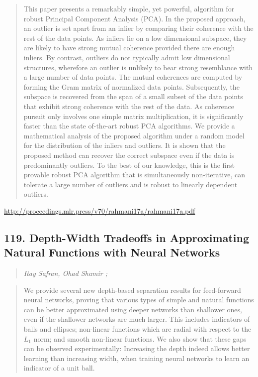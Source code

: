 \documentclass{article}
\begin{document}
\begin{quote}
    This paper presents a remarkably simple, yet powerful, algorithm for robust Principal Component Analysis (PCA). In the proposed approach, an outlier is set apart from an inlier by comparing their coherence with the rest of the data points. As inliers lie on a low dimensional subspace, they are likely to have strong mutual coherence provided there are enough inliers. By contrast, outliers do not typically admit low dimensional structures, wherefore an outlier is unlikely to bear strong resemblance with a large number of data points. The mutual coherences are computed by forming the Gram matrix of normalized data points. Subsequently, the subspace is recovered from the span of a small subset of the data points that exhibit strong coherence with the rest of the data. As coherence pursuit only involves one simple matrix multiplication, it is significantly faster than the state of-the-art robust PCA algorithms. We provide a mathematical analysis of the proposed algorithm under a random model for the distribution of the inliers and outliers. It is shown that the proposed method can recover the correct subspace even if the data is predominantly outliers. To the best of our knowledge, this is the first provable robust PCA algorithm that is simultaneously non-iterative, can tolerate a large number of outliers and is robust to linearly dependent outliers.  
\end{quote}

\href{http://proceedings.mlr.press/v70/rahmani17a/rahmani17a.pdf}{http://proceedings.mlr.press/v70/rahmani17a/rahmani17a.pdf}

\subsection{119. Depth-Width Tradeoffs in Approximating Natural Functions with Neural Networks}

\begin{quote}
\footnotesize{\textit{Itay Safran, Ohad Shamir ;}}

\end{quote}

\begin{quote}
    We provide several new depth-based separation results for feed-forward neural networks, proving that various types of simple and natural functions can be better approximated using deeper networks than shallower ones, even if the shallower networks are much larger. This includes indicators of balls and ellipses; non-linear functions which are radial with respect to the $L_1$ norm; and smooth non-linear functions. We also show that these gaps can be observed experimentally: Increasing the depth indeed allows better learning than increasing width, when training neural networks to learn an indicator of a unit ball.  
\end{quote}
\end{document}
